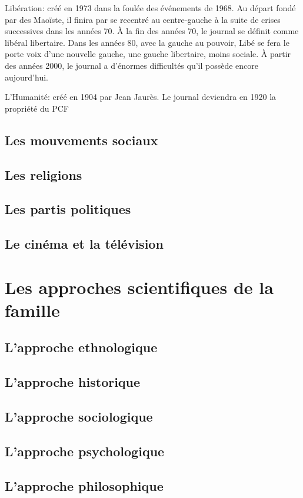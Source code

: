 \documentclass[12pt, a4paper, openany]{book}
\begin{document}
Libération: créé en 1973 dans la foulée des événements de 1968. Au départ fondé par des Maoïste, il finira par se recentré au centre-gauche à la suite de crises successives dans les années 70. À la fin des années 70, le journal se définit comme libéral libertaire. Dans les années 80, avec la gauche au pouvoir, Libé se fera le porte voix d'une nouvelle gauche, une gauche libertaire, moins sociale. À partir des années 2000, le journal a d'énormes difficultés qu'il possède encore aujourd'hui.


L'Humanité: créé en 1904 par Jean Jaurès. Le journal deviendra en 1920 la propriété du  PCF




\chapter{Les mouvements sociaux}

\chapter{Les religions}

\chapter{Les partis politiques}

\chapter{Le cinéma et la télévision}


\part{Les approches scientifiques de la famille}

\chapter{L'approche ethnologique}

\chapter{L'approche historique}

\chapter{L'approche sociologique}

\chapter{L'approche psychologique}

\chapter{L'approche philosophique}
\end{document}
